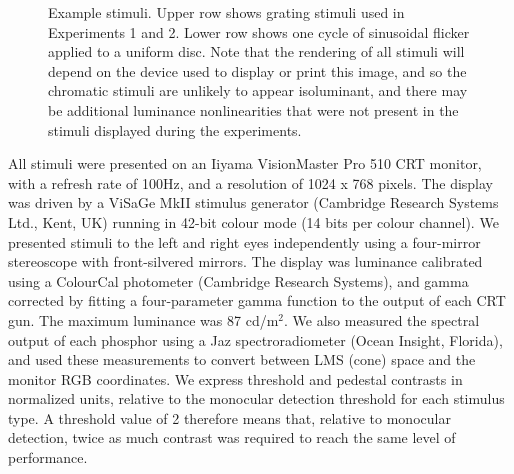 \documentclass[
  letterpaper,
  DIV=11,
  numbers=noendperiod]{scrartcl}
\begin{document}
\begin{figure}


\caption{\label{fig-examplestim}Example stimuli. Upper row shows grating
stimuli used in Experiments 1 and 2. Lower row shows one cycle of
sinusoidal flicker applied to a uniform disc. Note that the rendering of
all stimuli will depend on the device used to display or print this
image, and so the chromatic stimuli are unlikely to appear isoluminant,
and there may be additional luminance nonlinearities that were not
present in the stimuli displayed during the experiments.}

\end{figure}%

All stimuli were presented on an Iiyama VisionMaster Pro 510 CRT
monitor, with a refresh rate of 100Hz, and a resolution of 1024 x 768
pixels. The display was driven by a ViSaGe MkII stimulus generator
(Cambridge Research Systems Ltd., Kent, UK) running in 42-bit colour
mode (14 bits per colour channel). We presented stimuli to the left and
right eyes independently using a four-mirror stereoscope with
front-silvered mirrors. The display was luminance calibrated using a
ColourCal photometer (Cambridge Research Systems), and gamma corrected
by fitting a four-parameter gamma function to the output of each CRT
gun. The maximum luminance was 87 cd/m\(^2\). We also measured the
spectral output of each phosphor using a Jaz spectroradiometer (Ocean
Insight, Florida), and used these measurements to convert between LMS
(cone) space and the monitor RGB coordinates. We express threshold and
pedestal contrasts in normalized units, relative to the monocular
detection threshold for each stimulus type. A threshold value of 2
therefore means that, relative to monocular detection, twice as much
contrast was required to reach the same level of performance.
\end{document}
